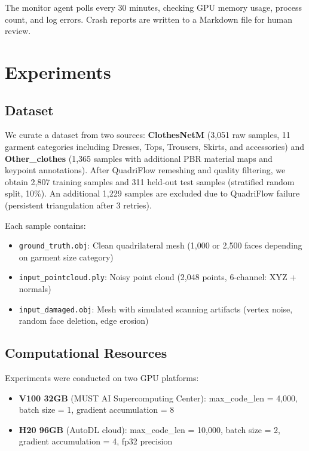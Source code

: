 \documentclass[conference]{IEEEtran}
\begin{document}
The monitor agent polls every 30 minutes, checking GPU memory usage, process count, and log errors.
Crash reports are written to a Markdown file for human review.

\section{Experiments}

\subsection{Dataset}

We curate a dataset from two sources:
\textbf{ClothesNetM} (3,051 raw samples, 11 garment categories including Dresses, Tops, Trousers, Skirts, and accessories) and \textbf{Other\_clothes} (1,365 samples with additional PBR material maps and keypoint annotations).
After QuadriFlow remeshing and quality filtering, we obtain 2,807 training samples and 311 held-out test samples (stratified random split, 10\%).
An additional 1,229 samples are excluded due to QuadriFlow failure (persistent triangulation after 3 retries).

Each sample contains:
\begin{itemize}
\item \texttt{ground\_truth.obj}: Clean quadrilateral mesh (1,000 or 2,500 faces depending on garment size category)
\item \texttt{input\_pointcloud.ply}: Noisy point cloud (2,048 points, 6-channel: XYZ + normals)
\item \texttt{input\_damaged.obj}: Mesh with simulated scanning artifacts (vertex noise, random face deletion, edge erosion)
\end{itemize}

\subsection{Computational Resources}

Experiments were conducted on two GPU platforms:
\begin{itemize}
\item \textbf{V100 32GB} (MUST AI Supercomputing Center): max\_code\_len = 4,000, batch size = 1, gradient accumulation = 8
\item \textbf{H20 96GB} (AutoDL cloud): max\_code\_len = 10,000, batch size = 2, gradient accumulation = 4, fp32 precision
\end{itemize}
\end{document}
